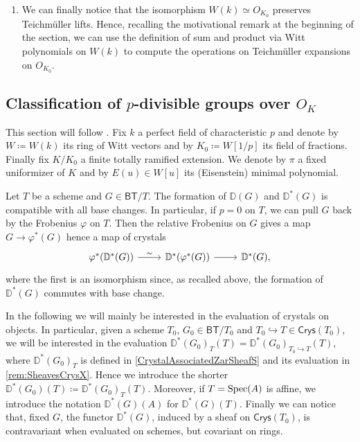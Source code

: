 \begin{rem}[]
\begin{enumerate}
\item We can finally notice that the isomorphism $W(k) \simeq O_{K_0}$ preserves
	Teichmüller lifts. Hence, recalling the motivational remark at the beginning
	of the section, we can use the definition of sum and product via
	Witt polynomials on $W(k)$ to compute the operations on
	Teichmüller expansions on $O_{K_0}$.
\end{enumerate}
\end{rem}



\subsection{Classification of \texorpdfstring{$p$}{p}-divisible groups
	over \texorpdfstring{$O_{ K }$}{the ring of integers of K}}
This section will follow \cite[Appendix A]{Kisin}.
Fix $k$ a perfect field of characteristic $p$ and denote by
$W \coloneqq W(k)$ its ring of Witt vectors and by $K_0 \coloneqq W[1/p]$
its field of fractions.
Finally fix $K/K_0$ a finite totally ramified extension.
We denote by $\pi$ a fixed uniformizer of $K$ and by $E(u) \in W[u]$
its (Eisenstein) minimal polynomial.


\begin{rem}[]
	Let $T$ be a scheme and $G \in \mathsf{BT}/T$.
	The formation of $\mathbb{D}(G)$ and $\mathbb{D}^*(G)$ is compatible with all base changes.
	In particular, if $p = 0$ on $T$, we can pull $G$ back by the Frobenius $\varphi$ on $T$.
	Then the relative Frobenius on $G$ gives a map $G \to \varphi^*(G)$
	hence a map of crystals
	\begin{equation*}
	\begin{tikzcd}
		\varphi^* (\mathbb{D}^*(G)) \arrow[r, "\sim", rightarrow] &
		\mathbb{D}^*(\varphi^*(G)) \arrow[r, "", rightarrow] &
		\mathbb{D}^*(G)
	,\end{tikzcd}
	\end{equation*}
	where the first is an isomorphism since, as recalled above, the formation of
	$\mathbb{D}^*(G)$ commutes with base change.
\end{rem}


\begin{ntt}[]
	In the following we will mainly be interested in the evaluation of
	crystals on objects.
	In particular, given a scheme $T_0$, $G_0 \in \mathsf{BT}/T_0$ and 
	$T_0 \hookrightarrow T \in \mathsf{Crys}(T_0)$, we will be interested in the
	evaluation $\mathbb{D}^*(G_0)_{T}(T) = \mathbb{D}^*(G_0)_{T_0 \hookrightarrow T}(T)$,
	where $\mathbb{D}^*(G_0)_T$ is defined in \cref{CrystalAssociatedZarSheafS}
	and its evaluation in \cref{rem:SheavesCrysX}.
	Hence we introduce the shorter
	$\mathbb{D}^*(G_0)(T) \coloneqq \mathbb{D}^*(G_0)_T(T)$.
	Moreover, if $T = \operatorname{Spec}(A)$ is affine, we introduce the notation
	$\mathbb{D}^*(G)(A)$ for $\mathbb{D}^*(G)(T)$.
	Finally we can notice that, fixed $G$, the functor $\mathbb{D}^*(G)$,
	induced by a sheaf on $\mathsf{Crys}(T_0)$,
	is contravariant when evaluated on schemes, but covariant on rings.
\end{ntt}



